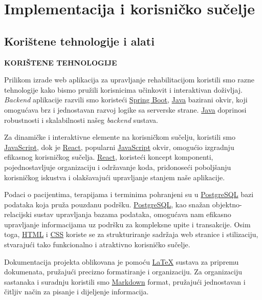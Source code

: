 \chapter{Implementacija i korisničko sučelje}
		
		
		\section{Korištene tehnologije i alati}
	
			
\textbf{	KORIŠTENE TEHNOLOGIJE
} 

Prilikom izrade web aplikacija za upravljanje rehabilitacijom koristili smo razne tehnologije kako bismo pružili korisnicima učinkovit i interaktivan doživljaj. \textit{Backend} aplikacije razvili smo koristeći \href{https://www.spring.io/projects/spring-boot}{Spring Boot}, \href{https://www.oracle.com/java}{Java} bazirani okvir, koji omogućava brz i jednostavan razvoj logike sa serverske strane. \href{https://www.oracle.com/java}{Java} doprinosi robustnosti i skalabilnosti našeg \textit{backend} sustava.

Za dinamičke i interaktivne elemente na korisničkom sučelju, koristili smo \href{https://www.developer.mozilla.org/en-US/docs/Web/JavaScript}{JavaScript}, dok je \href{https://www.reactjs.org}{React}, popularni \href{https://www.developer.mozilla.org/en-US/docs/Web/JavaScript}{JavaScript} okvir, omogućio izgradnju efikasnog korisničkog sučelja. \href{https://www.reactjs.org}{React}, koristeći koncept komponenti, pojednostavljuje organizaciju i održavanje koda, pridonoseći poboljšanju korisničkog iskustva i olakšavajući upravljanje stanjem naše aplikacije.

Podaci o pacijentima, terapijama i terminima pohranjeni su u \href{https://www.postgresql.org}{PostgreSQL} bazi podataka koja pruža pouzdanu podršku. \href{https://www.postgresql.org}{PostgreSQL}, kao snažan objektno-relacijski sustav upravljanja bazama podataka, omogućava nam efikasno upravljanje informacijama uz podršku za kompleksne upite i transakcije. Osim toga, \href{https://www.developer.mozilla.org/en-US/docs/Web/HTML}{HTML} i \href{https://www.developer.mozilla.org/en-US/docs/Web/CSS}{CSS} koriste se za strukturiranje sadržaja web stranice i stilizaciju, stvarajući tako funkcionalno i atraktivno korisničko sučelje.

Dokumentacija projekta oblikovana je pomoću \href{https://www.overleaf.com/learn/latex/Learn_LaTeX_in_30_minutes}{LaTeX} sustava za pripremu dokumenata, pružajući precizno formatiranje i organizaciju. Za organizaciju sastanaka i suradnju koristili smo \href{https://www.markdownguide.org}{Markdown} format, pružajući jednostavan i čitljiv način za pisanje i dijeljenje informacija.

